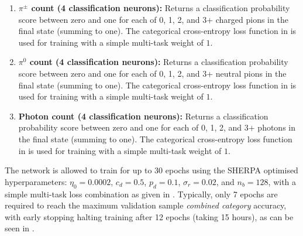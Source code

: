 \begin{enumerate}
          (summing to one). The categorical cross-entropy loss function in
           is used for training with a simple multi-task
          weight of $1$.
    \item \textbf{$\pi^{\pm}$ count (4 classification neurons):} Returns a classification
          probability score between zero and one for each of 0, 1, 2, and 3+ charged pions in the
          final state (summing to one). The categorical cross-entropy loss function in
           is used for training with a simple multi-task
          weight of $1$.
    \item \textbf{$\pi^{0}$ count (4 classification neurons):} Returns a classification
          probability score between zero and one for each of 0, 1, 2, and 3+ neutral pions in the
          final state (summing to one). The categorical cross-entropy loss function in
           is used for training with a simple multi-task
          weight of $1$.
    \item \textbf{Photon count (4 classification neurons):} Returns a classification probability
          score between zero and one for each of 0, 1, 2, and 3+ photons in the final state
          (summing to one). The categorical cross-entropy loss function in
           is used for training with a simple multi-task
          weight of $1$.
\end{enumerate}

The network is allowed to train for up to 30 epochs using the SHERPA optimised hyperparameters:
$\eta_{0}=0.0002$, $c_{d}=0.5$, $p_{d}=0.1$, $\sigma_{r}=0.02$, and $n_{b}=128$, with a simple
multi-task loss combination as given in . Typically, only 7 epochs
are required to reach the maximum validation sample \emph{combined category} accuracy, with early
stopping halting training after 12 epochs (taking 15 hours), as can be seen in
.

